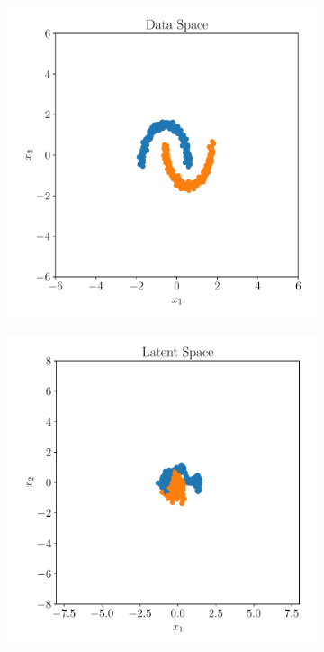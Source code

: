 \begin{figure}[htpb]
    \centering
    \begin{subfigure}[]{0.4\textwidth}
        \centering
    \includegraphics[width=\linewidth]{figures/toy_example/moons/toy_data.pdf}
        \caption{}
        \label{fig:}
    \end{subfigure}
    \begin{subfigure}[]{0.4\textwidth}
        \centering
    \includegraphics[width=\linewidth]{figures/toy_example/moons/latent_space.pdf}

\end{subfigure}
\end{figure}
